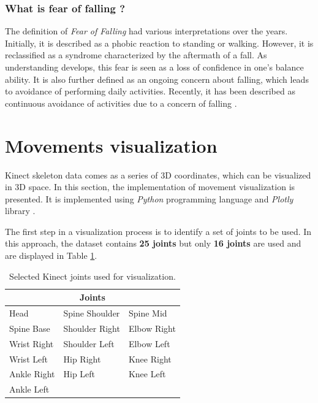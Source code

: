         \subsubsection{What is fear of falling ?}
        
            The definition of \textit{Fear of Falling} had various interpretations over the years. Initially, it is described as a phobic reaction to standing or walking. However, it is reclassified as a syndrome characterized by the aftermath of a fall. As understanding develops, this fear is seen as a loss of confidence in one's balance ability. It is also further defined as an ongoing concern about falling, which leads to avoidance of performing daily activities. Recently, it has been described as continuous avoidance of activities due to a concern of falling \cite{jung_fear_2008}.
    
    \section{Movements visualization} \label{sec:movements_visualization}
        
        Kinect skeleton data comes as a series of 3D coordinates, which can be visualized in 3D space. In this section, the implementation of movement visualization is presented. It is implemented using \textit{Python} programming language and \textit{Plotly} library \cite{plotly}.

        The first step in a visualization process is to identify a set of joints to be used. In this approach, the dataset contains \textbf{25 joints} but only \textbf{16 joints} are used and are displayed in Table \ref{tab:joints_select}. 

        \begin{table}[H]
            \centering
            \caption{Selected Kinect joints used for visualization.}
            \label{tab:joints_select}
            \begin{tabularx}{1.0\textwidth}{XXX}
                \toprule
                \multicolumn{3}{c}{\textbf{Joints}} \\
                \midrule
                Head & Spine Shoulder & Spine Mid \\
                Spine Base & Shoulder Right & Elbow Right \\
                Wrist Right & Shoulder Left & Elbow Left \\
                Wrist Left & Hip Right & Knee Right \\
                Ankle Right & Hip Left & Knee Left \\
                Ankle Left & & \\
                \bottomrule
            \end{tabularx}
        \end{table}
        
